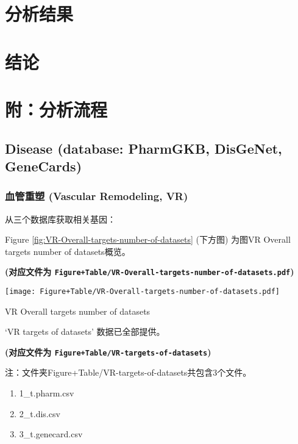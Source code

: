 \documentclass[
]{article}
\providecommand{\tightlist}{%
  \setlength{\itemsep}{0pt}\setlength{\parskip}{0pt}}
\begin{document}
\hypertarget{results}{%
\section{分析结果}\label{results}}

\hypertarget{dis}{%
\section{结论}\label{dis}}

\hypertarget{workflow}{%
\section{附：分析流程}\label{workflow}}

\hypertarget{disease-database-pharmgkb-disgenet-genecards}{%
\subsection{Disease (database: PharmGKB, DisGeNet, GeneCards)}\label{disease-database-pharmgkb-disgenet-genecards}}

\hypertarget{vr}{%
\subsubsection{血管重塑 (Vascular Remodeling, VR)}\label{vr}}

从三个数据库获取相关基因：

Figure \ref{fig:VR-Overall-targets-number-of-datasets} (下方图) 为图VR Overall targets number of datasets概览。

\textbf{(对应文件为 \texttt{Figure+Table/VR-Overall-targets-number-of-datasets.pdf})}

\def\@captype{figure}
\begin{center}
\texttt{[image: Figure+Table/VR-Overall-targets-number-of-datasets.pdf]}
\caption{VR Overall targets number of datasets}\label{fig:VR-Overall-targets-number-of-datasets}
\end{center}

`VR targets of datasets' 数据已全部提供。

\textbf{(对应文件为 \texttt{Figure+Table/VR-targets-of-datasets})}

\begin{center}\begin{tcolorbox}[colback=gray!10, colframe=gray!50, width=0.9\linewidth, arc=1mm, boxrule=0.5pt]注：文件夹Figure+Table/VR-targets-of-datasets共包含3个文件。

\begin{enumerate}\tightlist
\item 1\_t.pharm.csv
\item 2\_t.dis.csv
\item 3\_t.genecard.csv
\end{enumerate}\end{tcolorbox}
\end{center}
\end{document}
